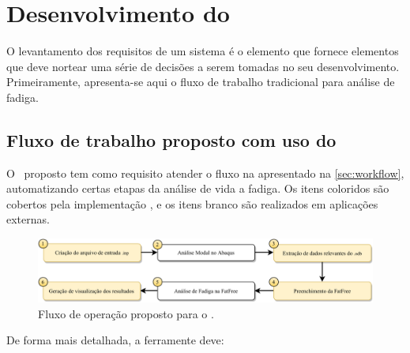\chapter{Desenvolvimento do \frame}\label{chap:software}

O levantamento dos requisitos de um sistema é o elemento que fornece elementos que deve nortear uma série de decisões a serem tomadas no seu desenvolvimento. Primeiramente, apresenta-se aqui o fluxo de trabalho tradicional para análise de fadiga.




\section{Fluxo de trabalho proposto com uso do \frame}


O \frame\ proposto tem como requisito atender o fluxo na apresentado na \autoref{sec:workflow}, automatizando certas etapas da análise de vida a fadiga. Os itens coloridos são cobertos pela implementação \frame, e os itens  branco são realizados em aplicações externas.


\begin{figure}[!ht]
    \centering
    \caption{Fluxo de operação proposto para o \frame.}\label{fig:workflow}
    \includegraphics[width=\textwidth]{imagens/fluxograma_automatizado}
\end{figure}

De forma mais detalhada, a ferramente deve:

